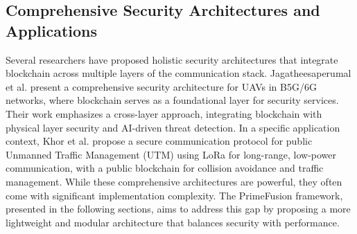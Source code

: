\subsection{Comprehensive Security Architectures and Applications}
Several researchers have proposed holistic security architectures that integrate blockchain across multiple layers of the communication stack. Jagatheesaperumal et al. \cite{jagatheesaperumal2023blockchain} present a comprehensive security architecture for UAVs in B5G/6G networks, where blockchain serves as a foundational layer for security services. Their work emphasizes a cross-layer approach, integrating blockchain with physical layer security and AI-driven threat detection. In a specific application context, Khor et al. \cite{khor2025secure} propose a secure communication protocol for public Unmanned Traffic Management (UTM) using LoRa for long-range, low-power communication, with a public blockchain for collision avoidance and traffic management. While these comprehensive architectures are powerful, they often come with significant implementation complexity. The PrimeFusion framework, presented in the following sections, aims to address this gap by proposing a more lightweight and modular architecture that balances security with performance.

